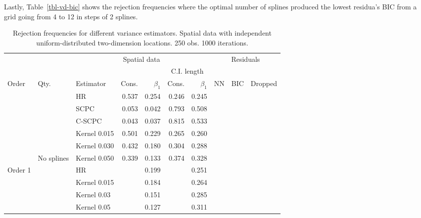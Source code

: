 \documentclass[
]{article}
\begin{document}
Lastly, Table~\ref{tbl-vd-bic} shows the rejection frequencies where the
optimal number of splines produced the lowest residua's BIC from a grid
going from 4 to 12 in steps of 2 splines.
\newpage
\hypertarget{tbl-vd-grid}{}
\begin{longtable}[t]{lllrrrrrrr}
\caption{\label{tbl-vd-grid}Rejection frequencies for different variance estimators. Spatial data
with independent uniform-distributed two-dimension locations. 250 obs.
1000 iterations. }\tabularnewline

\toprule
\multicolumn{2}{c}{ } & \multicolumn{5}{c}{Spatial data} & \multicolumn{3}{c}{Residuals} \\
\cmidrule(l{3pt}r{3pt}){3-7} \cmidrule(l{3pt}r{3pt}){8-10}
\multicolumn{5}{c}{ } & \multicolumn{2}{c}{C.I. length} \\
\cmidrule(l{3pt}r{3pt}){6-7}
Order & Qty. & Estimator & Cons. & $\beta_1$ & Cons.  & $\beta_1$  & NN & BIC & Dropped\\
\midrule \endhead
 &  & HR & 0.537 & 0.254 & 0.246 & 0.245 &  &  & \\

 &  & SCPC & 0.053 & 0.042 & 0.793 & 0.508 &  &  & \\

 &  & C-SCPC & 0.043 & 0.037 & 0.815 & 0.533 &  &  & \\

 &  & Kernel 0.015 & 0.501 & 0.229 & 0.265 & 0.260 &  &  & \\

 &  & Kernel 0.030 & 0.432 & 0.180 & 0.304 & 0.288 &  &  & \\

\multirow[t]{-6}{*}{\raggedright\arraybackslash } & \multirow[t]{-6}{*}{\raggedright\arraybackslash No splines} & Kernel 0.050 & 0.339 & 0.133 & 0.374 & 0.328 & \multirow[t]{-6}{*}{\raggedleft\arraybackslash 0.630} & \multirow[t]{-6}{*}{\raggedleft\arraybackslash 711.648} & \multirow[t]{-6}{*}{\raggedleft\arraybackslash }\\
\cmidrule{1-10}
\multirow[t]{25}{*}{\raggedright\arraybackslash Order 1} &  & HR &  & 0.199 &  & 0.251 &  &  & \\

 &  & Kernel 0.015 &  & 0.184 &  & 0.264 &  &  & \\

 &  & Kernel 0.03 &  & 0.151 &  & 0.285 &  &  & \\

 &  & Kernel 0.05 &  & 0.127 &  & 0.311 &  &  & \\


\end{longtable}
\end{document}
